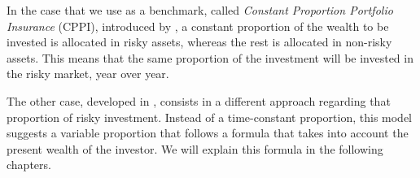 In the case that we use as a benchmark, called \textit{Constant Proportion Portfolio Insurance} (CPPI), introduced by \cite{a:perold-constant}, a constant proportion of the wealth to be invested is allocated in risky assets, whereas the rest is allocated in non-risky assets. This means that the same proportion of the investment will be invested in the risky market, year over year.

The other case, developed in \cite{a:guillen-optimisation}, consists in a different approach regarding that proportion of risky investment. Instead of a time-constant proportion, this model suggests a variable proportion that follows a formula that takes into account the present wealth of the investor. We will explain this formula in the following chapters.